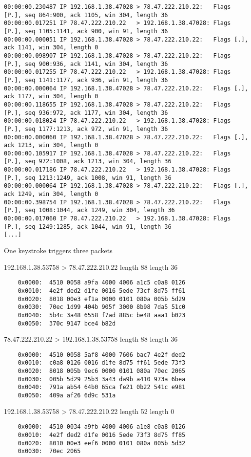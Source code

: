 \documentclass[9pt]{article}
\begin{document}
\begin{slide}
\begin{verbatim}
00:00:00.230487 IP 192.168.1.38.47028 > 78.47.222.210.22:   Flags [P.], seq 864:900, ack 1105, win 304, length 36
00:00:00.017251 IP 78.47.222.210.22   > 192.168.1.38.47028: Flags [P.], seq 1105:1141, ack 900, win 91, length 36
00:00:00.000051 IP 192.168.1.38.47028 > 78.47.222.210.22:   Flags [.],  ack 1141, win 304, length 0
00:00:00.098907 IP 192.168.1.38.47028 > 78.47.222.210.22:   Flags [P.], seq 900:936, ack 1141, win 304, length 36
00:00:00.017255 IP 78.47.222.210.22   > 192.168.1.38.47028: Flags [P.], seq 1141:1177, ack 936, win 91, length 36
00:00:00.000064 IP 192.168.1.38.47028 > 78.47.222.210.22:   Flags [.],  ack 1177, win 304, length 0
00:00:00.118655 IP 192.168.1.38.47028 > 78.47.222.210.22:   Flags [P.], seq 936:972, ack 1177, win 304, length 36
00:00:00.018024 IP 78.47.222.210.22   > 192.168.1.38.47028: Flags [P.], seq 1177:1213, ack 972, win 91, length 36
00:00:00.000060 IP 192.168.1.38.47028 > 78.47.222.210.22:   Flags [.],  ack 1213, win 304, length 0
00:00:00.105917 IP 192.168.1.38.47028 > 78.47.222.210.22:   Flags [P.], seq 972:1008, ack 1213, win 304, length 36
00:00:00.017186 IP 78.47.222.210.22   > 192.168.1.38.47028: Flags [P.], seq 1213:1249, ack 1008, win 91, length 36
00:00:00.000064 IP 192.168.1.38.47028 > 78.47.222.210.22:   Flags [.],  ack 1249, win 304, length 0
00:00:00.398754 IP 192.168.1.38.47028 > 78.47.222.210.22:   Flags [P.], seq 1008:1044, ack 1249, win 304, length 36
00:00:00.017060 IP 78.47.222.210.22   > 192.168.1.38.47028: Flags [P.], seq 1249:1285, ack 1044, win 91, length 36
[...]
\end{verbatim}
	\ei
	\item One keystroke triggers three packets
	\item 192.168.1.38.53758 > 78.47.222.210.22 length 88 length 36
\begin{verbatim}
	0x0000:  4510 0058 a9fa 4000 4006 a1c5 c0a8 0126
	0x0010:  4e2f ded2 d1fe 0016 5ede 73cf 8d75 ff61
	0x0020:  8018 00e3 ef1a 0000 0101 080a 005b 5d29
	0x0030:  70ec 1d99 404b 905f 3000 8b98 7da5 51c0
	0x0040:  5b4c 3a48 6558 f7ad 885c be48 aaa1 b023
	0x0050:  370c 9147 bce4 b82d
\end{verbatim}

	\item 78.47.222.210.22 > 192.168.1.38.53758 length 88 length 36
\begin{verbatim}
	0x0000:  4510 0058 5af8 4000 7606 bac7 4e2f ded2
	0x0010:  c0a8 0126 0016 d1fe 8d75 ff61 5ede 73f3
	0x0020:  8018 005b 9ec6 0000 0101 080a 70ec 2065
	0x0030:  005b 5d29 25b3 3a43 da9b a410 973a 6bea
	0x0040:  791a ab54 64b0 65ca fe21 0b22 541c e981
	0x0050:  409a af26 6d9c 531a
\end{verbatim}

	\item  192.168.1.38.53758 > 78.47.222.210.22 length 52 length 0
\begin{verbatim}
	0x0000:  4510 0034 a9fb 4000 4006 a1e8 c0a8 0126
	0x0010:  4e2f ded2 d1fe 0016 5ede 73f3 8d75 ff85
	0x0020:  8010 00e3 eef6 0000 0101 080a 005b 5d32
	0x0030:  70ec 2065
\end{verbatim}
	
\ei
\end{slide}
\end{document}
